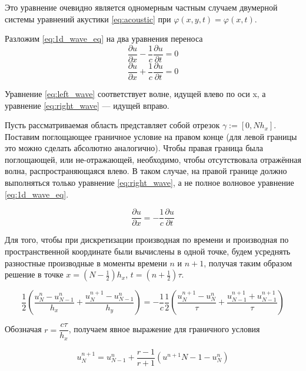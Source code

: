 Это уравнение очевидно является одномерным частным случаем двумерной системы уравнений акустики \eqref{eq:acoustic} при $\varphi(x,y,t) = \varphi(x,t)$.

Разложим \eqref{eq:1d_wave_eq} на два уравнения переноса
\begin{equation}
    \dfrac{\partial u}{\partial x} - \dfrac{1}{c} \dfrac{\partial u}{\partial t} = 0
    \label{eq:left_wave}
\end{equation}
\begin{equation}
    \dfrac{\partial u}{\partial x} + \dfrac{1}{c} \dfrac{\partial u}{\partial t} = 0
    \label{eq:right_wave}
\end{equation}

Уравнение \eqref{eq:left_wave} соответствует волне, идущей влево по оси x, а уравнение \eqref{eq:right_wave} --- идущей вправо.

Пусть рассматриваемая область представляет собой отрезок $\gamma := [0, N h_x]$. Поставим поглощающее граничное условие на правом конце (для левой границы это можно сделать абсолютно аналогично). Чтобы правая граница была поглощающей, или не-отражающей, необходимо, чтобы отсутствовала отражённая волна, распространяющаяся влево. В таком случае, на правой границе должно выполняться только уравнение \eqref{eq:right_wave}, а не полное волновое уравнение \eqref{eq:1d_wave_eq}.

\begin{equation}
    \dfrac{\partial u}{\partial x} = -\dfrac{1}{c} \dfrac{\partial u}{\partial t}
\end{equation}

Для того, чтобы при дискретизации производная по времени и производная по пространственной координате были вычислены в одной точке, будем усреднять разностные производные в моменты времени $n$ и $n+1$, получая таким образом решение в точке $x = \left(N-\frac{1}{2}\right)h_x$, $t=\left(n+\frac{1}{2}\right)\tau$. \cite{arch_comp_sim}

\begin{equation}
    \dfrac{1}{2} \left(\dfrac{u^n_N - u^n_{N-1}}{h_x} + \dfrac{u^{n+1}_N - u^n_{N-1}}{h_y} \right) = -\dfrac{1}{c} \dfrac{1}{2}\left(\dfrac{u^{n+1}_N - u^n_N}{\tau} + \dfrac{u^{n+1}_{N-1} + u^{n+1}_{N-1}}{\tau} \right)
\end{equation}

Обозначая $r = \dfrac{c \tau}{h_x}$, получаем явное выражение для граничного условия

\begin{equation}
    u^{n+1}_N = u^n_{N-1} + \dfrac{r-1}{r+1}(u^{n+1}{N-1}-u^n_N)
\end{equation}

